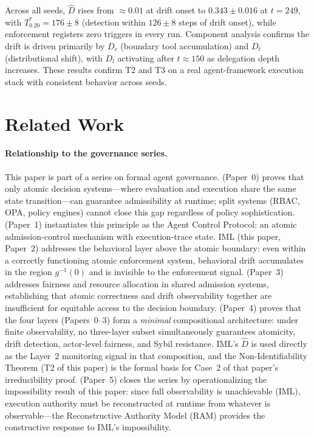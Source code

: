 \documentclass[11pt]{article}
\newcommand{\Dhat}{\widehat{D}}
\begin{document}
Across all seeds, $\Dhat$ rises from $\approx 0.01$ at drift onset to
$0.343 \pm 0.016$ at $t=249$, with $T^*_{0.20} = 176 \pm 8$ (detection
within $126 \pm 8$ steps of drift onset), while enforcement registers zero
triggers in every run.  Component analysis confirms the drift is driven
primarily by $D_c$ (boundary tool accumulation) and $D_t$ (distributional
shift), with $D_l$ activating after $t \approx 150$ as delegation depth
increases.  These results confirm T2 and T3 on a real agent-framework
execution stack with consistent behavior across seeds.

\section{Related Work}
\label{sec:related}

\paragraph{Relationship to the governance series.}
This paper is part of a series on formal agent governance.
\citet{fernandez2026a} (Paper~0) proves that only atomic decision
systems---where evaluation and execution share the same state
transition---can guarantee admissibility at runtime; split systems
(RBAC, OPA, policy engines) cannot close this gap regardless of policy
sophistication.
\citet{fernandez2026acp} (Paper~1) instantiates this principle as the
Agent Control Protocol: an atomic admission-control mechanism with
execution-trace state.
IML (this paper, Paper~2) addresses the behavioral layer above the atomic
boundary: even within a correctly functioning atomic enforcement system,
behavioral drift accumulates in the region $g^{-1}(0)$ and is invisible
to the enforcement signal.
\citet{fairgov26} (Paper~3) addresses fairness and resource allocation in
shared admission systems, establishing that atomic correctness and drift
observability together are insufficient for equitable access to the
decision boundary.
\citet{fernandez2026comp} (Paper~4) proves that the four layers
(Papers~0--3) form a \emph{minimal} compositional architecture: under
finite observability, no three-layer subset simultaneously guarantees
atomicity, drift detection, actor-level fairness, and Sybil resistance.
IML's $\Dhat$ is used directly as the Layer~2 monitoring signal in that
composition, and the Non-Identifiability Theorem (T2 of this paper) is
the formal basis for Case~2 of that paper's irreducibility proof.
\citet{fernandez2026ram} (Paper~5) closes the series by operationalizing
the impossibility result of this paper: since full observability is
unachievable (IML), execution authority must be reconstructed at runtime
from whatever is observable---the Reconstructive Authority Model (RAM)
provides the constructive response to IML's impossibility.
\end{document}

